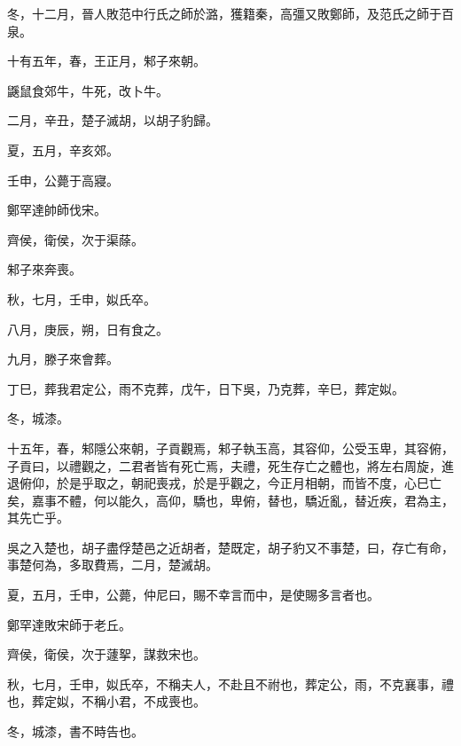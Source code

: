 \begin{pinyinscope}
冬，十二月，晉人敗范中行氏之師於潞，獲籍秦，高彊又敗鄭師，及范氏之師于百泉。

十有五年，春，王正月，邾子來朝。

鼷鼠食郊牛，牛死，改卜牛。

二月，辛丑，楚子滅胡，以胡子豹歸。

夏，五月，辛亥郊。

壬申，公薨于高寢。

鄭罕達帥師伐宋。

齊侯，衛侯，次于渠蒢。

邾子來奔喪。

秋，七月，壬申，姒氏卒。

八月，庚辰，朔，日有食之。

九月，滕子來會葬。

丁巳，葬我君定公，雨不克葬，戊午，日下吳，乃克葬，辛巳，葬定姒。

冬，城漆。

十五年，春，邾隱公來朝，子貢觀焉，邾子執玉高，其容仰，公受玉卑，其容俯，子貢曰，以禮觀之，二君者皆有死亡焉，夫禮，死生存亡之體也，將左右周旋，進退俯仰，於是乎取之，朝祀喪戎，於是乎觀之，今正月相朝，而皆不度，心巳亡矣，嘉事不體，何以能久，高仰，驕也，卑俯，替也，驕近亂，替近疾，君為主，其先亡乎。

吳之入楚也，胡子盡俘楚邑之近胡者，楚既定，胡子豹又不事楚，曰，存亡有命，事楚何為，多取費焉，二月，楚滅胡。

夏，五月，壬申，公薨，仲尼曰，賜不幸言而中，是使賜多言者也。

鄭罕達敗宋師于老丘。

齊侯，衛侯，次于蘧挐，謀救宋也。

秋，七月，壬申，姒氏卒，不稱夫人，不赴且不祔也，葬定公，雨，不克襄事，禮也，葬定姒，不稱小君，不成喪也。

冬，城漆，書不時告也。


\end{pinyinscope}